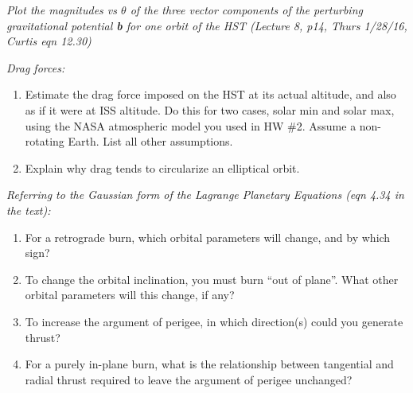 \documentclass[onecolumn,10pt]{jhwhw}
\begin{document}
\clearpage
\problem{}
\textit{Plot the magnitudes vs $\theta$ of the three vector components of the perturbing gravitational potential \textbf{b} for one orbit of the HST (Lecture 8, p14, Thurs 1/28/16, Curtis eqn 12.30)}

\clearpage
\problem{}
\textit{Drag forces:}
\begin{enumerate}
\item Estimate the drag force imposed on the HST at its actual altitude, and also as if it were at ISS altitude. Do this for two cases, solar min and solar max, using the NASA atmospheric model you used in HW \#2. Assume a non-rotating Earth. List all other assumptions.
\item Explain why drag tends to circularize an elliptical orbit.
\end{enumerate}

\clearpage
\problem{}
\textit{Referring to the Gaussian form of the Lagrange Planetary Equations (eqn 4.34 in the text):}
\begin{enumerate}
\item For a retrograde burn, which orbital parameters will change, and by which sign?
\item To change the orbital inclination, you must burn ``out of plane''. What other orbital parameters will this change, if any?
\item To increase the argument of perigee, in which direction(s) could you generate thrust?
\item For a purely in-plane burn, what is the relationship between tangential and radial thrust required to leave the argument of perigee unchanged?
\end{enumerate}
\end{document}
